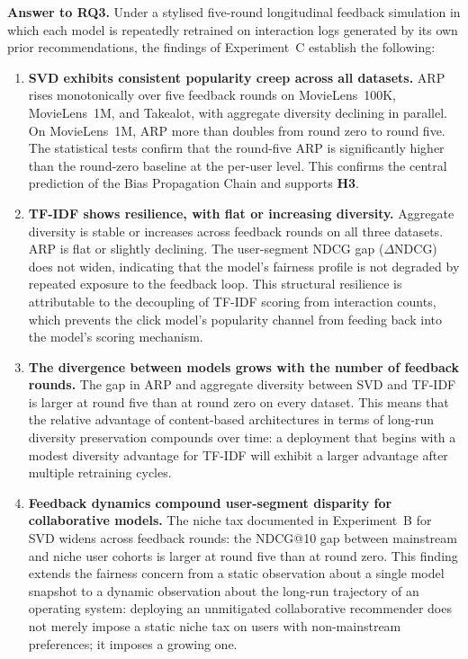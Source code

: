 \documentclass[11pt,a4paper]{report}
\begin{document}
\textbf{Answer to RQ3.} Under a stylised five-round longitudinal feedback simulation in which each model is repeatedly retrained on interaction logs generated by its own prior recommendations, the findings of Experiment~C establish the following:

\begin{enumerate}
    \item \textbf{SVD exhibits consistent popularity creep across all datasets.} ARP rises monotonically over five feedback rounds on MovieLens~100K, MovieLens~1M, and Takealot, with aggregate diversity declining in parallel. On MovieLens~1M, ARP more than doubles from round zero to round five. The statistical tests confirm that the round-five ARP is significantly higher than the round-zero baseline at the per-user level. This confirms the central prediction of the Bias Propagation Chain and supports \textbf{H3}.

    \item \textbf{TF-IDF shows resilience, with flat or increasing diversity.} Aggregate diversity is stable or increases across feedback rounds on all three datasets. ARP is flat or slightly declining. The user-segment NDCG gap ($\Delta$NDCG) does not widen, indicating that the model's fairness profile is not degraded by repeated exposure to the feedback loop. This structural resilience is attributable to the decoupling of TF-IDF scoring from interaction counts, which prevents the click model's popularity channel from feeding back into the model's scoring mechanism.

    \item \textbf{The divergence between models grows with the number of feedback rounds.} The gap in ARP and aggregate diversity between SVD and TF-IDF is larger at round five than at round zero on every dataset. This means that the relative advantage of content-based architectures in terms of long-run diversity preservation compounds over time: a deployment that begins with a modest diversity advantage for TF-IDF will exhibit a larger advantage after multiple retraining cycles.

    \item \textbf{Feedback dynamics compound user-segment disparity for collaborative models.} The niche tax documented in Experiment~B for SVD widens across feedback rounds: the NDCG@10 gap between mainstream and niche user cohorts is larger at round five than at round zero. This finding extends the fairness concern from a static observation about a single model snapshot to a dynamic observation about the long-run trajectory of an operating system: deploying an unmitigated collaborative recommender does not merely impose a static niche tax on users with non-mainstream preferences; it imposes a growing one.


\end{enumerate}
\end{document}
